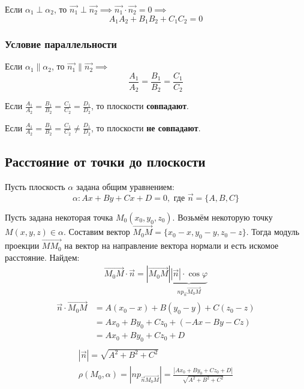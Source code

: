 Если $\alpha_1 \perp \alpha_2$, то $\vec{n_1} \perp \vec{n_2} \implies \vec{n_1} \cdot \vec{n_2} = 0 \implies$ \[
  \boxed{A_1 A_2 + B_1 B_2 + C_1 C_2 = 0}
\]

\subsubsection{Условие параллельности}

Если $\alpha_1 \parallel \alpha_2$, то $\vec{n_1} \parallel \vec{n_2} \implies$ \[
  \boxed{\frac{A_1}{A_2} = \frac{B_1}{B_2} = \frac{C_1}{C_2}}
\]

\begin{note}
  Если $\frac{A_1}{A_2} = \frac{B_1}{B_2} = \frac{C_1}{C_2} = \frac{D_1}{D_2}$, то плоскости \textbf{совпадают}.
\end{note}
\begin{note}
  Если $\frac{A_1}{A_2} = \frac{B_1}{B_2} = \frac{C_1}{C_2} \neq \frac{D_1}{D_2}$, то плоскости \textbf{не совпадают}.
\end{note}

\subsection{Расстояние от точки до плоскости}

Пусть плоскость $\alpha$ задана общим уравнением: \[
    \alpha: Ax + By + Cx + D = 0, \text{ где } \vec{n} = \{A, B, C\} 
\] 

Пусть задана некоторая точка $M_0(x_0, y_0, z_0)$. 
Возьмём некоторую точку $M(x, y, z) \in \alpha$. 
Составим вектор $\overrightarrow{M_0M} = \{x_0 - x, y_0 - y, z_0 - z\}$. 
Тогда модуль проекции $\overrightarrow{MM_0}$ на вектор на направление вектора нормали и есть искомое расстояние. 
Найдем: 
\begin{gather*}
  \overrightarrow{M_0M} \cdot \vec{n} = |\overrightarrow{M_0M}|\underbrace
  {|\vec{n}| \cdot \cos \varphi}_
  {np_{\vec{n}}\overrightarrow{M_0M}}
\end{gather*}
\begin{align*}
  \vec{n} \cdot \overrightarrow{M_0M} &= A(x_0 - x) + B(y_0 - y) + C(z_0 - z) \\
                                 &= Ax_0 + By_0 + Cz_0 + (-Ax - By - Cz) \\
                                 &= Ax_0 + By_0 + Cz_0  + D \\
\end{align*}
\begin{gather*}
  |\vec{n}| = \sqrt{A^2 + B^2 + C^2} \\
  \boxed{\rho(M_0, \alpha) = |np_{\vec{n}\overrightarrow{M_0M}}| = \frac{|Ax_0 + By_0 + Cz_0 + D| }{\sqrt{A^2 + B^2 + C^2} } }
\end{gather*}   

